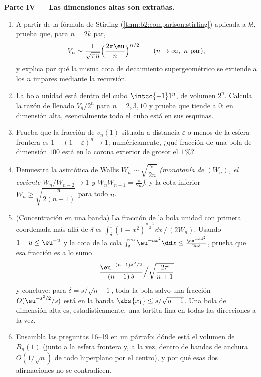 \begin{problem}[{Problema de fin de semana --- $V_n =
\pi^{n/2}/\Gamma(\frac n2 + 1)$, y la rareza de las dimensiones
altas}]
\medskip
\noindent\textbf{Parte IV --- Las dimensiones altas son extrañas.}
\begin{enumerate}[resume]
  \item A partir de la fórmula de Stirling
        (\cref{thm:b2:comparison:stirling}) aplicada a $k!$, prueba
        que, para $n = 2k$ par,
        \[
        V_n \sim \frac{1}{\sqrt{\pi n}}
        \Bigl(\frac{2\pi\eu}{n}\Bigr)^{n/2}
        \qquad (n \to \infty, \ n \text{ par}),
        \]
        y explica por qué la misma cota de decaimiento
        supergeométrico se extiende a los $n$ impares mediante la
        recursión.
  \item La bola unidad está dentro del cubo $\intcc{-1}1^n$, de
        volumen $2^n$. Calcula la razón de llenado $V_n/2^n$ para $n
        = 2, 3, 10$ y prueba que tiende a $0$: en dimensión alta,
        esencialmente todo el cubo está en sus esquinas.
  \item Prueba que la fracción de $v_n(1)$ situada a distancia
        $\varepsilon$ o menos de la esfera frontera es $1 - (1 -
        \varepsilon)^n \to 1$; numéricamente, ¿qué fracción de una
        bola de dimensión $100$ está en la corona exterior de grosor
        el $1\,\%$?
  \item Demuestra la asintótica de Wallis $W_n \sim
        \sqrt{\dfrac{\pi}{2n}}$ \emph{(monotonía de $(W_n)$, el
        cociente $W_n/W_{n-2} \to 1$ y $W_nW_{n-1} = \frac\pi{2n}$)},
        y la cota inferior $W_n \geq \sqrt{\dfrac{\pi}{2(n+1)}}$
        para todo $n$.
  \item (Concentración en una banda) La fracción de la bola unidad
        con primera coordenada más allá de $\delta$ es
        $\int_\delta^1(1 - x^2)^{\frac{n-1}2}\dd x \,\big/\, (2W_n)$.
        Usando $1 - u \leq \eu^{-u}$ y la cota de la cola
        $\int_\delta^\infty \eu^{-a x^2}\dd x \leq
        \frac{\eu^{-a\delta^2}}{2a\delta}$, prueba que esa fracción
        es a lo sumo
        \[
        \frac{\eu^{-(n-1)\delta^2/2}}{(n-1)\,\delta}
        \Big/ \sqrt{\frac{2\pi}{n+1}}
        \]
        y concluye: para $\delta = s/\sqrt{n-1}$, toda la bola salvo
        una fracción $O(\eu^{-s^2/2}/s)$ está en la banda
        $\abs{x_1} \leq s/\sqrt{n-1}$. Una bola de dimensión alta
        es, estadísticamente, una tortita fina en todas las
        direcciones a la vez.
  \item Ensambla las preguntas 16--19 en un párrafo: dónde está el
        volumen de $B_n(1)$ (junto a la esfera frontera y, a la vez,
        dentro de bandas de anchura $O(1/\sqrt n)$ de todo
        hiperplano por el centro), y por qué esas dos afirmaciones
        no se contradicen.
\end{enumerate}


\end{problem}
